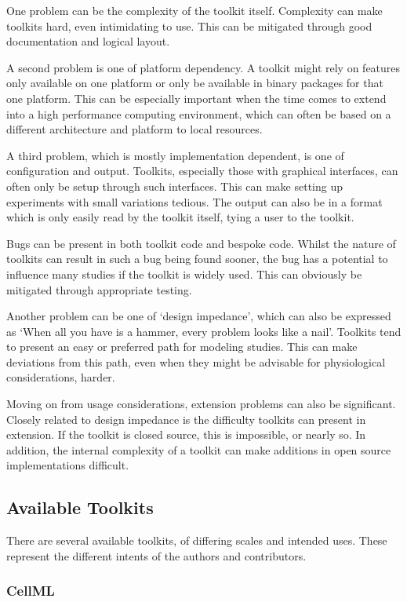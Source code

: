 One problem can be the complexity of the toolkit itself.
Complexity can make toolkits hard, even intimidating to use.
This can be mitigated through good documentation and logical layout.

A second problem is one of platform dependency.
A toolkit might rely on features only available on one platform or only be
available in binary packages for that one platform.
This can be especially important when the time comes to extend into a high
performance computing environment, which can often be based on a different
architecture and platform to local resources.

A third problem, which is mostly implementation dependent, is one of
configuration and output.
Toolkits, especially those with graphical interfaces, can often only be setup
through such interfaces.
This can make setting up experiments with small variations tedious.
The output can also be in a format which is only easily read by the toolkit
itself, tying a user to the toolkit.

Bugs can be present in both toolkit code and bespoke code.
Whilst the nature of toolkits can result in such a bug being found sooner, the
bug has a potential to influence many studies if the toolkit is widely used.
This can obviously be mitigated through appropriate testing.

Another problem can be one of `design impedance', which can also be expressed as
`When all you have is a hammer, every problem looks like a nail'.
Toolkits tend to present an easy or preferred path for modeling studies.
This can make deviations from this path, even when they might be advisable for
physiological considerations, harder.

Moving on from usage considerations, extension problems can also be significant.
Closely related to design impedance is the difficulty toolkits can present in
extension.
If the toolkit is closed source, this is impossible, or nearly so.
In addition, the internal complexity of a toolkit can make additions in open
source implementations difficult.

\subsection{Available Toolkits}

There are several available toolkits, of differing scales and intended uses.
These represent the different intents of the authors and contributors.

\subsubsection{CellML}

